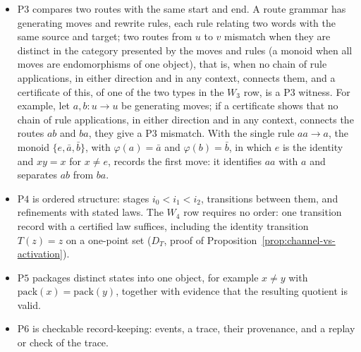 \documentclass[11pt]{article}
\theoremstyle{definition}
\newcommand{\Ptwo}{\ensuremath{\mathrm{P2}}}
\newcommand{\Pthree}{\ensuremath{\mathrm{P3}}}
\newcommand{\Pfour}{\ensuremath{\mathrm{P4}}}
\newcommand{\Pfive}{\ensuremath{\mathrm{P5}}}
\newcommand{\Psix}{\ensuremath{\mathrm{P6}}}
\begin{document}
\begin{itemize}[topsep=2pt,itemsep=1pt]
    unrealizability requires the recorded finite absence certificate, and a
    satisfying realizer yields a \(W_2\) witness only when the comparison
    certifies that the realizer set is not a union
    of \(E\)-classes. If it is such a union, as for the pullback of a
    predicate on packaged states, the comparison fails and there is no \(W_2\)
    witness; the pullback alone does not establish a \(W_5\) witness.
    ``Macro'' refers to the declared status of \(s\), not to definability over
    the quotient: in the satisfying branch the witness certifies that
    realizability of \(s\) is not already decided by the packaging, so the
    \Ptwo{} content is not \Pfive{} content. For example, with the states \(0,1,2,3\) and the packaging \(q\) of the
    running example, the specification \(s(r)\equiv(r=0\lor r=2)\) has realizer
    set \(\{0,2\}\); the \(q\)-class \(\{0,1\}\) meets both \(\{0,2\}\) and its
    complement, so realizability of \(s\) is not decided by \(q\)
    (Proposition~\ref{prop:p2-witness}).
  \item \Pthree{} compares two routes with the same start and end. A route
    grammar has generating moves and rewrite rules, each rule relating two
    words with the same source and target; two routes from \(u\)
    to \(v\) mismatch when they are distinct in the category presented by the
    moves and rules (a monoid when all moves are endomorphisms of one object), that is, when no chain of rule applications, in either
    direction and in any context, connects them,
    and a certificate of this, of one of the two types in the \(W_3\) row, is a
    \Pthree{} witness. For example, let
    \(a,b:u\to u\) be generating moves; if a certificate shows that no
    chain of rule applications, in either direction and in any context,
    connects the routes \(ab\) and
    \(ba\), they give a \Pthree{} mismatch. With the single rule
    \(aa\to a\), the monoid \(\{e,\bar a,\bar b\}\), with \(\varphi(a)=\bar a\) and
    \(\varphi(b)=\bar b\), in which \(e\) is the identity and \(xy=x\) for
    \(x\ne e\), records the first move: it identifies \(aa\) with \(a\) and
    separates \(ab\) from \(ba\).
  \item \Pfour{} is ordered structure: stages \(i_0<i_1<i_2\), transitions
    between them, and refinements with stated laws. The \(W_4\) row requires no order: one transition record with a certified law suffices, including the identity transition \(T(z)=z\) on a one-point set (\(D_T\), proof of Proposition~\ref{prop:channel-vs-activation}).
  \item \Pfive{} packages distinct states into one object, for example
    \(x\ne y\) with \(\mathrm{pack}(x)=\mathrm{pack}(y)\), together with
    evidence that the resulting quotient is valid.
  \item \Psix{} is checkable record-keeping: events, a trace, their
    provenance, and a replay or check of the trace.
\end{itemize}
\end{document}
